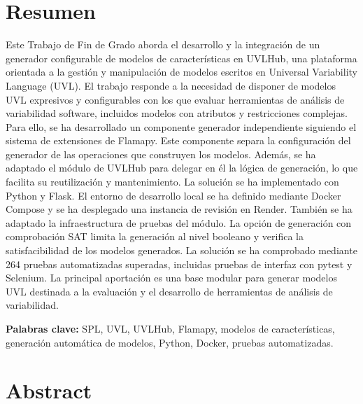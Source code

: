 \chapter*{Resumen}

Este Trabajo de Fin de Grado aborda el desarrollo y la integración de un
generador configurable de modelos de características en UVLHub, una plataforma
orientada a la gestión y manipulación de modelos escritos en Universal
Variability Language (UVL). El trabajo responde a la necesidad de disponer de
modelos UVL expresivos y configurables con los que evaluar herramientas de
análisis de variabilidad software, incluidos modelos con atributos y
restricciones complejas. Para ello, se ha desarrollado un componente
generador independiente siguiendo el sistema de extensiones de Flamapy. Este
componente separa la configuración del generador de las operaciones que
construyen los modelos. Además, se ha adaptado el módulo de UVLHub para
delegar en él la lógica de generación, lo que facilita su reutilización y
mantenimiento. La solución se ha implementado con Python y Flask. El entorno
de desarrollo local se ha definido mediante Docker Compose y se ha desplegado
una instancia de revisión en Render. También se ha adaptado la infraestructura
de pruebas del módulo. La opción de generación con comprobación SAT limita
la generación al nivel booleano y verifica la satisfacibilidad de los modelos
generados. La solución se ha comprobado mediante 264 pruebas automatizadas superadas, incluidas pruebas de interfaz con pytest y Selenium. La principal aportación es una base modular para generar
modelos UVL destinada a la evaluación y el desarrollo de herramientas de
análisis de variabilidad.

\vspace{1.5em}
\noindent\textbf{Palabras clave:} SPL, UVL, UVLHub, Flamapy, modelos de
características, generación automática de modelos, Python, Docker, pruebas
automatizadas.

\chapter*{Abstract}

